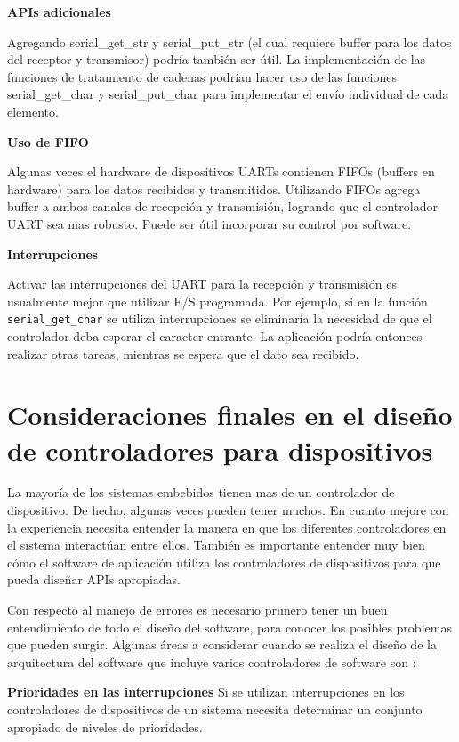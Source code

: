 \documentclass[output=paper, 
colorlinks,
citecolor=brown,
newtxmath
]{langscibook}
\begin{document}
\textbf{APIs adicionales}

Agregando serial\_get\_str y serial\_put\_str (el cual requiere buffer para
los datos del receptor y transmisor) podría también ser útil. La implementación
de las funciones de tratamiento de cadenas podrían hacer uso de las funciones
serial\_get\_char y serial\_put\_char para implementar el envío individual
de cada elemento.

\textbf{Uso de FIFO}

Algunas veces el hardware de dispositivos UARTs contienen FIFOs (buffers en hardware) 
para los datos recibidos y transmitidos.
Utilizando FIFOs agrega buffer a ambos canales de recepción y transmisión,
logrando que el controlador UART  sea mas robusto. Puede
ser útil incorporar su control por software.

\textbf{Interrupciones}

Activar las interrupciones del UART para la recepción y transmisión es
usualmente mejor que utilizar E/S programada. Por ejemplo, si en la función
\texttt{serial\_get\_char} se utiliza interrupciones se eliminaría la necesidad
de que el controlador deba esperar el caracter entrante. 
La aplicación podría entonces realizar
otras tareas, mientras se espera que el dato sea recibido. 

\section {Consideraciones finales en el diseño de controladores para dispositivos}

La mayoría de los sistemas embebidos tienen mas de un controlador de dispositivo.
De hecho, algunas veces pueden tener muchos. En cuanto
mejore con la experiencia necesita entender la manera en que los
diferentes controladores en el sistema interactúan entre ellos. 
También es importante entender muy bien cómo el software de aplicación 
utiliza los controladores de dispositivos para que pueda diseñar APIs apropiadas.

Con respecto al manejo de errores es necesario primero tener un 
buen entendimiento de todo el diseño
del software, para conocer los posibles problemas que pueden surgir.
Algunas áreas a considerar cuando se realiza el diseño de la arquitectura
del software que incluye varios controladores de software son :

\textbf{Prioridades en las interrupciones}
Si se utilizan interrupciones en los controladores de dispositivos
de un sistema necesita determinar un conjunto apropiado de niveles
de prioridades.
\end{document}

